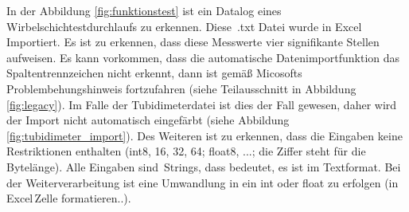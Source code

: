 In der Abbildung \ref{fig:funktionstest} ist ein Datalog eines Wirbelschichtestdurchlaufs zu erkennen. Diese \,{\Menlo .txt} Datei wurde in Excel Importiert. Es ist zu erkennen, dass diese Messwerte vier signifikante Stellen aufweisen. Es kann vorkommen, dass die automatische Datenimportfunktion das Spaltentrennzeichen nicht erkennt, dann ist gemäß Micosofts Problembehungshinweis fortzufahren (siehe Teilausschnitt in Abbildung \ref{fig:legacy}). Im Falle der Tubidimeterdatei ist dies der Fall gewesen, daher wird der Import nicht automatisch eingefärbt (siehe Abbildung \ref{fig:tubidimeter_import}). Des Weiteren ist zu erkennen, dass die Eingaben keine Restriktionen enthalten (int8, 16, 32, 64; float8, ...; die Ziffer steht für die Bytelänge). Alle Eingaben sind \,{\Menlo Strings}, dass bedeutet, es ist im Textformat. Bei der Weiterverarbeitung ist eine Umwandlung in ein int oder float zu erfolgen (in Excel\,{\Menlo  Zelle formatieren..}).


